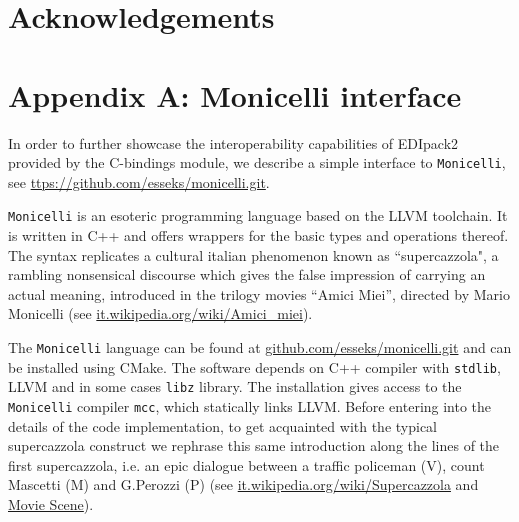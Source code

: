 \documentclass[preprint,3p,10pt]{elsarticle}
\def\NAME{{\rm EDIpack2}\xspace}
\begin{document}

\section*{Acknowledgements}

\section{Appendix A: Monicelli interface}\label{appendixA}
In order to further showcase the interoperability capabilities of
\NAME provided by the C-bindings module, we describe a simple interface to {\tt Monicelli}, see
\href{github.com/esseks/monicelli.git}{ttps://github.com/esseks/monicelli.git}. 

  
{\tt Monicelli} is an esoteric programming language based on the LLVM
toolchain.
It is written in C++ and offers wrappers for the basic
types and operations thereof. The syntax replicates a cultural italian
phenomenon known as ``supercazzola", a rambling nonsensical discourse
which gives the false impression of carrying an actual meaning,
introduced in the trilogy movies ``Amici Miei'', directed by Mario
Monicelli (see
\href{https://it.wikipedia.org/wiki/Amici_miei}{it.wikipedia.org/wiki/Amici\_miei}). 

The {\tt Monicelli} language can be found at
\href{https://github.com/esseks/monicelli.git}{github.com/esseks/monicelli.git}
and can be installed using CMake. The software depends on C++
compiler with {\tt stdlib}, LLVM and in some cases {\tt libz} library. The installation gives access to the {\tt
  Monicelli} compiler {\tt mcc}, which statically links LLVM. 
Before entering into the details of the code implementation, to get 
acquainted with the typical supercazzola construct we rephrase
this same introduction along the lines of the first supercazzola, i.e.
an epic dialogue between a traffic policeman (V), count Mascetti
(M) and G.Perozzi (P) (see
\href{https://it.wikipedia.org/wiki/Supercazzola#Origine}{it.wikipedia.org/wiki/Supercazzola}
and \href{https://www.youtube.com/watch?v=SF8YUFdP6eU}{Movie Scene}). 
\end{document}
